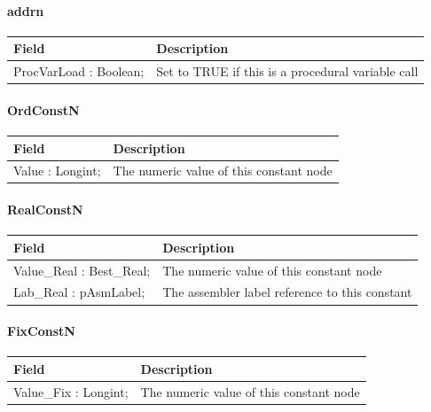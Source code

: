\documentclass [a4paper,12pt]{article}
\begin{document}
\paragraph{addrn}\mbox{}

\begin{longtable}{|l|p{10cm}|}
\hline
Field   & Description \\
\hline
\endhead
\hline
\endfoot
\textsf{ProcVarLoad : Boolean;}&
    Set to TRUE if this is a procedural variable call \\
\hline
\end{longtable}

\paragraph{OrdConstN}\mbox{}

\begin{longtable}{|l|p{10cm}|}
\hline
Field   & Description \\
\hline
\endhead
\hline
\endfoot
\textsf{Value : Longint;}&
    The numeric value of this constant node \\
\hline
\end{longtable}

\paragraph{RealConstN}\mbox{}

\begin{longtable}{|l|p{10cm}|}
\hline
Field   & Description \\
\hline
\endhead
\hline
\endfoot
\textsf{Value{\_}Real : Best{\_}Real;}&
    The numeric value of this constant node \\
\textsf{Lab{\_}Real : pAsmLabel;}&
    The assembler label reference to this constant \\
\hline
\end{longtable}

\paragraph{FixConstN}\mbox{}

\begin{longtable}{|l|p{10cm}|}
\hline
Field   & Description \\
\hline
\endhead
\hline
\endfoot
\textsf{Value{\_}Fix : Longint;}&
    The numeric value of this constant node \\
\hline
\end{longtable}
\end{document}
